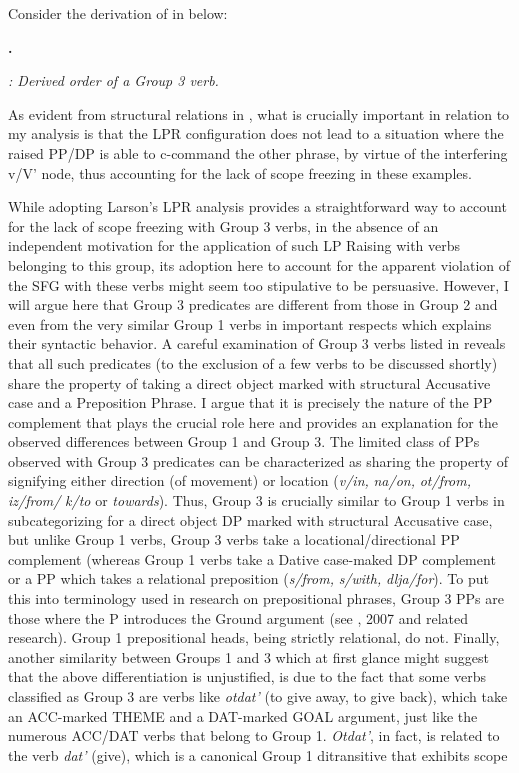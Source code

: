 \documentclass[output=paper,modfonts, nonflat]{langsci/langscibook}
\begin{document}
\begin{styleinnerExample}
Consider the derivation of  in  below:

\textbf{.}

  
 

\textit{: Derived order of a Group 3 verb.}

As evident from structural relations in , what is crucially important in relation to my analysis is that the LPR configuration does not lead to a situation where the raised PP/DP is able to c-command the other phrase, by virtue of the interfering v/V' node, thus accounting for the lack of scope freezing in these examples.

  While adopting Larson's LPR analysis provides a straightforward way to account for the lack of scope freezing with Group 3 verbs, in the absence of an independent motivation for the application of such LP Raising with verbs belonging to this group, its adoption here to account for the apparent violation of the SFG with these verbs might seem too stipulative to be persuasive. However, I will argue here that Group 3 predicates are different from those in Group 2 and even from the very similar Group 1 verbs in important respects which explains their syntactic behavior. A careful examination of Group 3 verbs listed in  reveals that all such predicates (to the exclusion of a few verbs to be discussed shortly) share the property of taking a direct object marked with structural Accusative case and a Preposition Phrase. I argue that it is precisely the nature of the PP complement that plays the crucial role here and provides an explanation for the observed differences between Group 1 and Group 3. The limited class of PPs observed with Group 3 predicates can be characterized as sharing the property of signifying either direction (of movement) or location (\textit{v/in,} \textit{na/on,} \textit{ot/from,} \textit{iz/from/} \textit{k/to} or \textit{towards}). Thus, Group 3 is crucially similar to Group 1 verbs in subcategorizing for a direct object DP marked with structural Accusative case, but unlike Group 1 verbs, Group 3 verbs take a locational/directional PP complement (whereas Group 1 verbs take a Dative case-maked DP complement or a PP which takes a relational preposition (\textit{s/from,} \textit{s/with,} \textit{dlja/for}). To put this into terminology used in research on prepositional phrases, Group 3 PPs are those where the P introduces the Ground argument (see \citealt{Svenonius2003}, 2007 and related research). Group 1 prepositional heads, being strictly relational, do not. Finally, another similarity between Groups 1 and 3 which at first glance might suggest that the above differentiation is unjustified, is due to the fact that some verbs classified as Group 3 are verbs like \textit{otdat'} (to give away, to give back), which take an ACC-marked THEME and a DAT-marked GOAL argument, just like the numerous ACC/DAT verbs that belong to Group 1. \textit{Otdat'}, in fact, is related to the verb \textit{dat'} (give), which is a canonical Group 1 ditransitive that exhibits scope 
\end{styleinnerExample}
\end{document}
